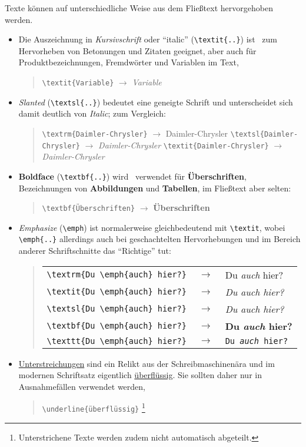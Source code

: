 Texte können auf unterschiedliche Weise aus dem Fließtext hervorgehoben werden.
\begin{itemize}
%
\item Die Auszeichnung in \textit{Kursivschrift} oder "`italic"' (\verb!\textit{..}!) ist \va\ zum Hervorheben von
Betonungen und Zitaten geeignet, aber auch für
Produktbezeichnungen, Fremdwörter und Variablen im Text, \zB
%
\begin{quote}
\verb!\textit{Variable}! $\rightarrow$ \textit{Variable}
\end{quote}
%
\item \textsl{Slanted} %
(\verb!\textsl{..}!) bedeutet eine geneigte Schrift und
unterscheidet sich damit deutlich von \textit{Italic}; 
zum Vergleich:
%
\begin{quote}
\verb!\textrm{Daimler-Chrysler}! $\rightarrow$ \textrm{Daimler-Chrysler} \newline%
\verb!\textsl{Daimler-Chrysler}! $\rightarrow$ \textsl{Daimler-Chrysler} \newline%
\verb!\textit{Daimler-Chrysler}! $\rightarrow$ \textit{Daimler-Chrysler}
\end{quote}
%
\item \textbf{Boldface} (\verb!\textbf{..}!) wird \ia\ verwendet für 
\textbf{Überschriften}, Bezeichnungen von \textbf{Abbildungen} und 
\textbf{Tabellen}, im Fließtext aber selten:
%
\begin{quote}
\verb!\textbf{Überschriften}! $\rightarrow$ \textbf{Überschriften}
\end{quote}
%
\item \emph{Emphasize} (\verb!\emph!) %
ist normalerweise gleichbedeutend mit \verb!\textit!, wobei
\verb!\emph{..}! allerdings auch bei geschachtelten
Hervorhebungen und im Bereich anderer Schriftschnitte das
"`Richtige"' tut: 
%
\begin{quote}
\setlength{\tabcolsep}{0pt}%
\begin{tabular}{lcl}
\verb!\textrm{Du \emph{auch} hier?}! & $\;\rightarrow\;$ &
    \textrm{Du \emph{auch} hier?}
\\
\verb!\textit{Du \emph{auch} hier?}! & $\;\rightarrow\;$ &
    \textit{Du \emph{auch} hier?} 
\\
\verb!\textsl{Du \emph{auch} hier?}! & $\;\rightarrow\;$ & 
    \textsl{Du \emph{auch} hier?}
\\
\verb!\textbf{Du \emph{auch} hier?}! & $\;\rightarrow\;$ & 
    \textbf{Du \emph{auch} hier?}
\\
\verb!\texttt{Du \emph{auch} hier?}! & $\;\rightarrow\;$ & 
    \texttt{Du \emph{auch} hier?}
\end{tabular}
\end{quote}
%
\item \underline{Unterstreichungen} sind ein Relikt aus der 
Schreibmaschinenära und im modernen Schriftsatz
eigentlich \underline{überflüssig}. Sie sollten daher nur in
Ausnahmefällen verwendet werden, \zB
%
\begin{quote}
\verb!\underline{überflüssig}!%
\footnote{Unterstrichene Texte werden zudem nicht automatisch abgeteilt.}
\end{quote}
%
\end{itemize}



